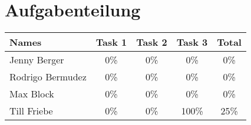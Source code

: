 \newpage
\section{Aufgabenteilung}
\begin{table}[htpb]
    \center
	\label{tab:Aufgabenteilung}
    \begin{tabular}{l|c|c|c|c}
        \large{Names}    & \large{Task 1} & \large{Task 2} & \large{Task 3} & \large{Total} \\ \hline
        Jenny Berger     &            0\% &            0\% &            0\% &           0\% \\
        Rodrigo Bermudez &            0\% &            0\% &            0\% &           0\% \\
        Max Block        &            0\% &            0\% &            0\% &           0\% \\
        Till Friebe      &            0\% &            0\% &          100\% &          25\%
    \end{tabular}
\end{table}

